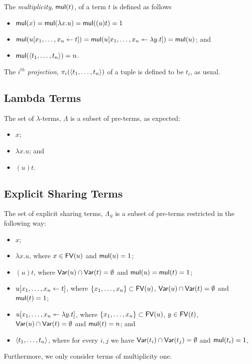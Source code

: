 \documentclass[11pt,a4paper]{article}
\theoremstyle{definition}
\theoremstyle{plain}
\theoremstyle{remark}
\begin{document}
The \emph{multiplicity}, ${\mathop{\mathsf{mul}}}(t)$, of a term $t$ is defined as follows

\begin{itemize}
	\item ${\mathop{\mathsf{mul}}}(x)={\mathop{\mathsf{mul}}}(\lambda x.u)={\mathop{\mathsf{mul}}}((u)t)=1$
	\item ${\mathop{\mathsf{mul}}}({ { {u}[{{x_1},\dots,{x_n}}\leftarrow{t}] } })={\mathop{\mathsf{mul}}}({ { {u}[{{x_1},\dots,{x_n}}\twoheadleftarrow{\lambda{y}.{t}}] } })={\mathop{\mathsf{mul}}}(u)$; and
	\item ${\mathop{\mathsf{mul}}}({\langle{t_1},\dots,{t_n}{\rangle}})=n$.
\end{itemize}

\newcommand{\terpr}[2]{{\pi_{#1}({#2})}}

The \emph{$i^{th}$ projection}, $\terpr{i}{\tertuple{t_1}{t_n}}$ of a tuple is defined to be $t_i$, as usual.

\subsection{Lambda Terms}

The set of $\lambda$-terms, $\Lambda$ is a subset of pre-terms, as expected:

\begin{itemize}
	\item $x$;
	\item $\lambda x.u$; and
	\item $(u)t$.
\end{itemize}

\subsection{Explicit Sharing Terms}

The set of explicit sharing terms, $\Lambda_S$ is a subset of pre-terms restricted in the following way:

\begin{itemize}
	\item $x$;
	\item $\lambda x.u$, where $x\in{\mathop{\mathsf{FV}}}(u)$ and ${\mathop{\mathsf{mul}}}(u)=1$;
	\item $(u)t$, where ${\mathop{\mathsf{Var}}}(u)\cap{\mathop{\mathsf{Var}}}(t)=\emptyset$ and ${\mathop{\mathsf{mul}}}(u)={\mathop{\mathsf{mul}}}(t)=1$;
	\item ${ { {u}[{{x_1},\dots,{x_n}}\leftarrow{t}] } }$, where $\{x_1,\dots,x_n\}\subset{\mathop{\mathsf{FV}}}(u)$, ${\mathop{\mathsf{Var}}}(u)\cap{\mathop{\mathsf{Var}}}(t)=\emptyset$ and ${\mathop{\mathsf{mul}}}(t)=1$;
	\item ${ { {u}[{{x_1},\dots,{x_n}}\twoheadleftarrow{\lambda{y}.{t}}] } }$, where $\{x_1,\dots,x_n\}\subset{\mathop{\mathsf{FV}}}(u)$, $y\in{\mathop{\mathsf{FV}}}(t)$, ${\mathop{\mathsf{Var}}}(u)\cap{\mathop{\mathsf{Var}}}(t)=\emptyset$ and ${\mathop{\mathsf{mul}}}(t)=n$; and
	\item ${\langle{t_1},\dots,{t_n}{\rangle}}$, where for every $i,j$ we have ${\mathop{\mathsf{Var}}}(t_i)\cap{\mathop{\mathsf{Var}}}(t_j)=\emptyset$ and ${\mathop{\mathsf{mul}}}(t_i)=1$,
\end{itemize}
Furthermore, we only consider terms of multiplicity one.
\end{document}
